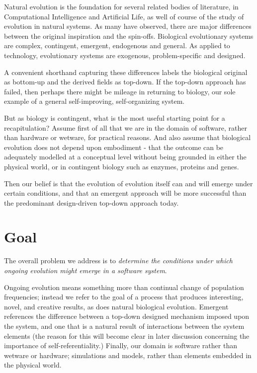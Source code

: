 \documentclass[]{report}
\begin{document}
Natural evolution is the foundation for several related bodies of literature, in Computational Intelligence and Artificial Life, as well of course of the study of evolution in natural systems. As many have observed, there are major differences between the original inspiration and the spin-offs. Biological evolutionary systems are complex, contingent, emergent, endogenous and general. As applied to technology, evolutionary systems are exogenous, problem-specific and designed.

A convenient shorthand capturing these differences labels the biological original as bottom-up and the derived fields as top-down. If the top-down approach has failed, then perhaps there might be mileage in returning to biology, our sole example of a general self-improving, self-organizing system.

But as biology is contingent, what is the most useful starting point for a recapitulation? Assume first of all that we are in the domain of software, rather than hardware or wetware, for practical reasons. And also assume that biological evolution does not depend upon embodiment - that the outcome can be adequately modelled at a conceptual level without being grounded in either the physical world, or in contingent biology such as enzymes, proteins and genes.

Then our belief is that the evolution of evolution itself can and will emerge under certain conditions, and that an emergent approach will be more successful than the predominant design-driven top-down approach today.

\section{Goal}

The overall problem we address is to \textit{determine the conditions under which ongoing evolution might emerge in a software system}. 

Ongoing evolution means something more than continual change of population frequencies; instead we refer to the goal of a process that produces interesting, novel, and creative results, as does natural biological evolution. Emergent references the difference between a top-down designed mechanism imposed upon the system, and one that is a natural result of interactions between the system elements (the reason for this will become clear in later discussion concerning the importance of self-referentiality.) Finally, our domain is software rather than wetware or hardware; simulations and models, rather than elements embedded in the physical world.
\end{document}
